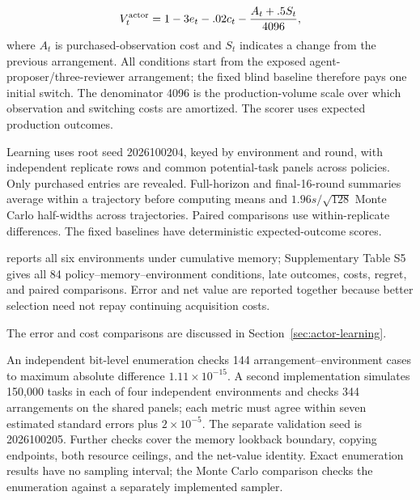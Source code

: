 \begin{equation}
V_t^{\rm actor}=1-3e_t-.02c_t-\frac{A_t+.5S_t}{4096},
\label{eq:actor-value}
\end{equation}
where $A_t$ is purchased-observation cost and $S_t$ indicates a change from the previous arrangement. All conditions start from the exposed agent-proposer/three-reviewer arrangement; the fixed blind baseline therefore pays one initial switch. The denominator 4096 is the production-volume scale over which observation and switching costs are amortized. The scorer uses expected production outcomes.

Learning uses root seed 2026100204, keyed by environment and round, with independent replicate rows and common potential-task panels across policies. Only purchased entries are revealed. Full-horizon and final-16-round summaries average within a trajectory before computing means and $1.96s/\sqrt{128}$ Monte Carlo half-widths across trajectories. Paired comparisons use within-replicate differences. The fixed baselines have deterministic expected-outcome scores.

 reports all six environments under cumulative memory; Supplementary Table S5 gives all 84 policy--memory--environment conditions, late outcomes, costs, regret, and paired comparisons. Error and net value are reported together because better selection need not repay continuing acquisition costs.

The error and cost comparisons are discussed in Section~\ref{sec:actor-learning}.

An independent bit-level enumeration checks 144 arrangement--environment cases to maximum absolute difference $1.11\times10^{-15}$. A second implementation simulates 150,000 tasks in each of four independent environments and checks 344 arrangements on the shared panels; each metric must agree within seven estimated standard errors plus $2\times10^{-5}$. The separate validation seed is 2026100205. Further checks cover the memory lookback boundary, copying endpoints, both resource ceilings, and the net-value identity. Exact enumeration results have no sampling interval; the Monte Carlo comparison checks the enumeration against a separately implemented sampler.
